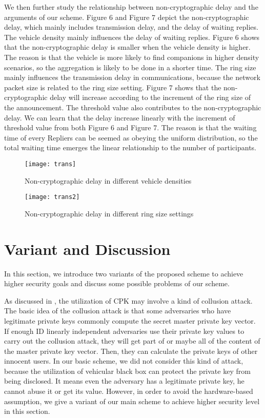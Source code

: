 \documentclass[a4paper]{article}
\begin{document}
We then further study the relationship between non-cryptographic delay and the arguments of our scheme. Figure 6 and Figure 7 depict the non-cryptographic delay, which mainly includes transmission delay, and the delay of waiting replies. The vehicle density mainly influences the delay of waiting replies. Figure 6 shows that the non-cryptographic delay is smaller when the vehicle density is higher. The reason is that the vehicle is more likely to find companions in higher density scenarios, so the aggregation is likely to be done in a shorter time. The ring size mainly influences the transmission delay in communications, because the network packet size is related to the ring size setting. Figure 7 shows that the non-cryptographic delay will increase according to the increment of the ring size of the announcement. The threshold value also contributes to the non-cryptographic delay. We can learn that the delay increase linearly with the increment of threshold value from both Figure 6 and Figure 7. The reason is that the waiting time of every Repliers can be seemed as obeying the uniform distribution, so the total waiting time emerges the linear relationship to the number of participants.

\begin{figure}
  \centering
  \texttt{[image: trans]}
  \caption{Non-cryptographic delay in different vehicle densities}
\end{figure}

\begin{figure}
  \centering
  \texttt{[image: trans2]}
  \caption{Non-cryptographic delay in different ring size settings}
\end{figure}

\section{Variant and Discussion}
In this section, we introduce two variants of the proposed scheme to achieve higher security goals and discuss some possible problems of our scheme.

As discussed in \cite{HLH12}, the utilization of CPK may involve a kind of collusion attack. The basic idea of the collusion attack is that some adversaries who have legitimate private keys commonly compute the secret master private key vector. If enough ID linearly independent adversaries use their private key values to carry out the collusion attack, they will get part of or maybe all of the content of the master private key vector. Then, they can calculate the private keys of other innocent users. In our basic scheme, we did not consider this kind of attack, because the utilization of vehicular black box can protect the private key from being disclosed. It means even the adversary has a legitimate private key, he cannot abuse it or get its value. However, in order to avoid the hardware-based assumption, we give a variant of our main scheme to achieve higher security level in this section.
\end{document}
